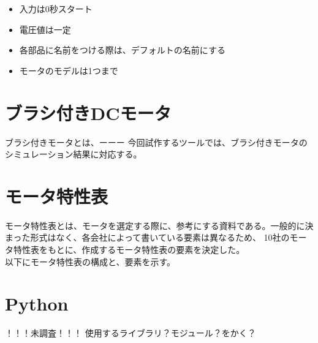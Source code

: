   \begin{itemize}
	  \item 入力は0秒スタート
	  \item 電圧値は一定
	  \item 各部品に名前をつける際は、デフォルトの名前にする
	  \item モータのモデルは1つまで
  \end{itemize}


  \section{ブラシ付きDCモータ}\label{}
  ブラシ付きモータとは、ーーー 
  今回試作するツールでは、ブラシ付きモータのシミュレーション結果に対応する。
  
\section{モータ特性表}\label{mortoku}
モータ特性表とは、モータを選定する際に、参考にする資料である。一般的に決まった形式はなく、各会社によって書いている要素は異なるため、
10社のモータ特性表をもとに、作成するモータ特性表の要素を決定した。\\
以下にモータ特性表の構成と、要素を示す。

  \section{Python}\label{python}
  ！！！未調査！！！
  使用するライブラリ？モジュール？をかく？


